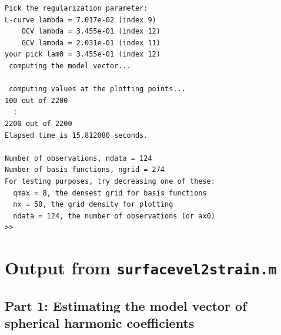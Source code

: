 \documentclass[11pt,titlepage,fleqn]{article}
\begin{document}
\begin{spacing}{1.0}
\begin{verbatim}
Pick the regularization parameter:
L-curve lambda = 7.017e-02 (index 9)
    OCV lambda = 3.455e-01 (index 12)
    GCV lambda = 2.031e-01 (index 11)
your pick lam0 = 3.455e-01 (index 12)
 computing the model vector...
  
 computing values at the plotting points...
100 out of 2200
  :
2200 out of 2200
Elapsed time is 15.812080 seconds.
  
Number of observations, ndata = 124
Number of basis functions, ngrid = 274
For testing purposes, try decreasing one of these:
  qmax = 8, the densest grid for basis functions
  nx = 50, the grid density for plotting
  ndata = 124, the number of observations (or ax0)
>> 
\end{verbatim}
\end{spacing}


\section{Output from {\tt surfacevel2strain.m}}
\label{sec:surfacevel2strain_out}

\subsection*{Part 1: Estimating the model vector of spherical harmonic coefficients}
\end{document}
